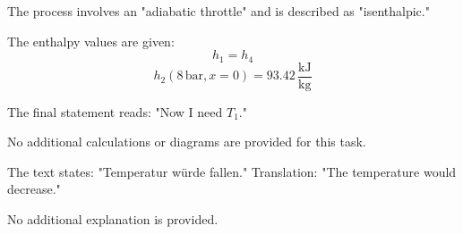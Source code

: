 The process involves an "adiabatic throttle" and is described as "isenthalpic."  

The enthalpy values are given:  
\[
h_1 = h_4
\]  
\[
h_2 (8 \, \text{bar}, x = 0) = 93.42 \, \frac{\text{kJ}}{\text{kg}}
\]  

The final statement reads:  
"Now I need \( T_1 \)."  

No additional calculations or diagrams are provided for this task.

The text states:  
"Temperatur würde fallen."  
Translation: "The temperature would decrease."  

No additional explanation is provided.